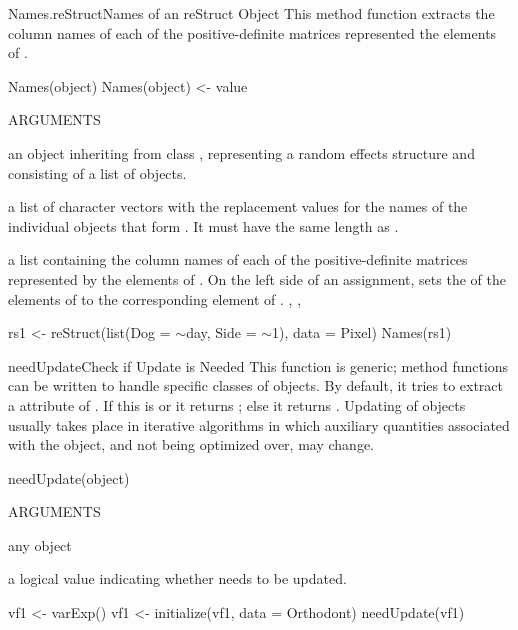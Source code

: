 \documentclass[pdftex]{article} \usepackage{url,graphicx}
\renewcommand{\Twiddle}{\mbox{\(\sim\)}}
\begin{document}
\begin{Helpfile}{Names.reStruct}{Names of an reStruct Object}
This method function extracts the column names of each of the
positive-definite matrices represented the 
elements of .
\begin{Example}
Names(object)
Names(object) <- value
\end{Example}
\begin{Argument}{ARGUMENTS}
\item[\Co{object:}]
an object inheriting from class ,
representing a random effects structure and consisting of a list of
 objects.
\item[\Co{value:}]
a list of character vectors with the replacement values
for the names of the individual  objects that form
. It must have the same length as .
\end{Argument}
a list containing the column names of each of the positive-definite
matrices represented by the  elements of .
On the left side of an assignment, sets the  of the
 elements of  to the corresponding element of
.
, ,
\need 15pt
\vspace{-16pt} 
\begin{Example}
rs1 <- reStruct(list(Dog = \Twiddle day, Side = \Twiddle 1), data = Pixel)
Names(rs1)
\end{Example}
\end{Helpfile}
\begin{Helpfile}{needUpdate}{Check if Update is Needed}
This function is generic; method functions can be written to handle
specific classes of objects. By default, it tries to extract a
 attribute of . If this is 
or  it returns ; else it returns .
Updating of objects usually takes place in iterative algorithms in
which auxiliary quantities associated with the object, and not being
optimized over, may change.
\begin{Example}
needUpdate(object)
\end{Example}
\begin{Argument}{ARGUMENTS}
\item[\Co{object:}]
any object
\end{Argument}
a logical value indicating whether  needs to be updated.
\need 15pt
\vspace{-16pt} 
\begin{Example}
vf1 <- varExp()
vf1 <- initialize(vf1, data = Orthodont)
needUpdate(vf1)
\end{Example}
\end{Helpfile}
\end{document}
